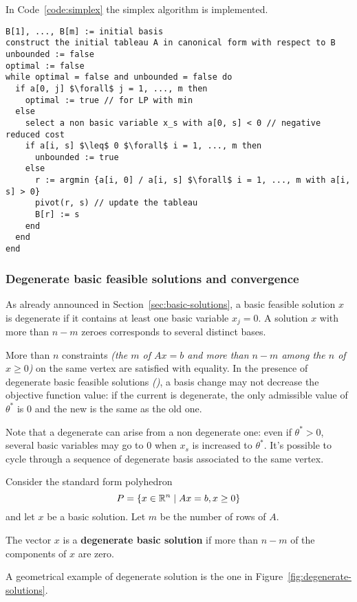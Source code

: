 \documentclass[english]{article}
\begin{document}
In Code~\ref{code:simplex} the simplex algorithm is implemented.

\begin{minipage}{0.99\textwidth}
  \begin{lstlisting}[caption={The simplex algorithm}, label={code:simplex}]
B[1], ..., B[m] := initial basis
construct the initial tableau A in canonical form with respect to B
unbounded := false
optimal := false
while optimal = false and unbounded = false do
  if a[0, j] $\forall$ j = 1, ..., m then
    optimal := true // for LP with min
  else
    select a non basic variable x_s with a[0, s] < 0 // negative reduced cost
    if a[i, s] $\leq$ 0 $\forall$ i = 1, ..., m then
      unbounded := true
    else
      r := argmin {a[i, 0] / a[i, s] $\forall$ i = 1, ..., m with a[i, s] > 0}
      pivot(r, s) // update the tableau
      B[r] := s
    end
  end
end
\end{lstlisting}
\end{minipage}

\subsubsection{Degenerate basic feasible solutions and convergence}

As already announced in Section~\ref{sec:basic-solutions}, a basic feasible solution \(x\) is degenerate if it contains at least one basic variable \(x_j = 0\).
A solution \(x\) with more than \(n -m\) zeroes corresponds to several distinct bases.

More than \(n\) constraints \textit{(the \(m\) of \(Ax = b\) and more than \(n-m\) among the \(n\) of \(x \geq 0\))} on the same vertex are satisfied with equality.
In the presence of degenerate basic feasible solutions \textit{(\BFS)}, a basis change may not decrease the objective function value:
if the current \BFS is degenerate, the only admissible value of \(\theta^\ast\) is \(0\) and the new \BFS is the same as the old one.

Note that a degenerate \BFS can arise from a non degenerate one:
even if \(\theta^\ast > 0\), several basic variables may go to \(0\) when \(x_s\) is increased to \(\theta^\ast\).
It's possible to cycle through a sequence of degenerate basis associated to the same vertex.

\begin{definition}
  Consider the standard form polyhedron
  \[P = \left\{ x \in \mathbb{R}^n \mid   Ax = b, x \geq 0 \right\}\]
  and let \(x\) be a basic solution.
  Let \(m\) be the number of rows of \(A\).

  The vector \(x\) is a \textbf{degenerate basic solution} if more than \(n-m\) of the components of \(x\) are zero.
\end{definition}
\bigskip
A geometrical example of degenerate solution is the one in Figure~\ref{fig:degenerate-solutions}.
\end{document}
